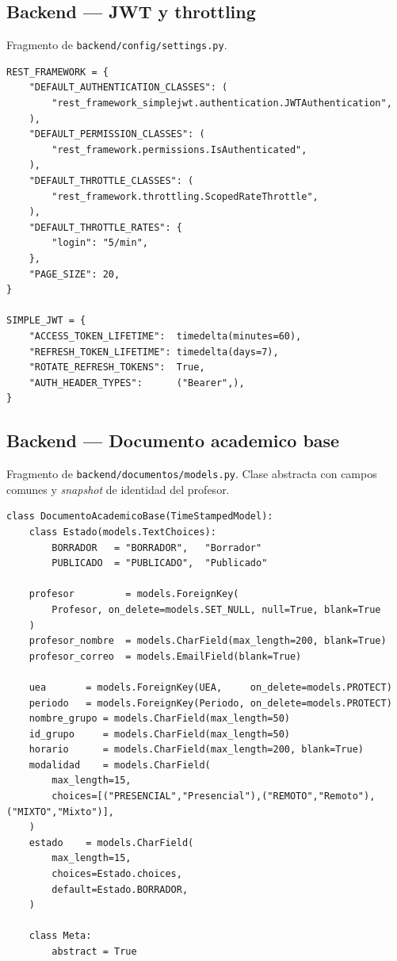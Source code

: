 \subsection{Backend --- JWT y throttling}

Fragmento de \texttt{backend/config/settings.py}.

\begin{Verbatim}[fontsize=\small, frame=single]
REST_FRAMEWORK = {
    "DEFAULT_AUTHENTICATION_CLASSES": (
        "rest_framework_simplejwt.authentication.JWTAuthentication",
    ),
    "DEFAULT_PERMISSION_CLASSES": (
        "rest_framework.permissions.IsAuthenticated",
    ),
    "DEFAULT_THROTTLE_CLASSES": (
        "rest_framework.throttling.ScopedRateThrottle",
    ),
    "DEFAULT_THROTTLE_RATES": {
        "login": "5/min",
    },
    "PAGE_SIZE": 20,
}

SIMPLE_JWT = {
    "ACCESS_TOKEN_LIFETIME":  timedelta(minutes=60),
    "REFRESH_TOKEN_LIFETIME": timedelta(days=7),
    "ROTATE_REFRESH_TOKENS":  True,
    "AUTH_HEADER_TYPES":      ("Bearer",),
}
\end{Verbatim}

\subsection{Backend --- Documento academico base}

Fragmento de \texttt{backend/documentos/models.py}. Clase abstracta con campos comunes y \emph{snapshot} de identidad del profesor.

\begin{Verbatim}[fontsize=\small, frame=single]
class DocumentoAcademicoBase(TimeStampedModel):
    class Estado(models.TextChoices):
        BORRADOR   = "BORRADOR",   "Borrador"
        PUBLICADO  = "PUBLICADO",  "Publicado"

    profesor         = models.ForeignKey(
        Profesor, on_delete=models.SET_NULL, null=True, blank=True
    )
    profesor_nombre  = models.CharField(max_length=200, blank=True)
    profesor_correo  = models.EmailField(blank=True)

    uea       = models.ForeignKey(UEA,     on_delete=models.PROTECT)
    periodo   = models.ForeignKey(Periodo, on_delete=models.PROTECT)
    nombre_grupo = models.CharField(max_length=50)
    id_grupo     = models.CharField(max_length=50)
    horario      = models.CharField(max_length=200, blank=True)
    modalidad    = models.CharField(
        max_length=15,
        choices=[("PRESENCIAL","Presencial"),("REMOTO","Remoto"),("MIXTO","Mixto")],
    )
    estado    = models.CharField(
        max_length=15,
        choices=Estado.choices,
        default=Estado.BORRADOR,
    )

    class Meta:
        abstract = True
\end{Verbatim}

